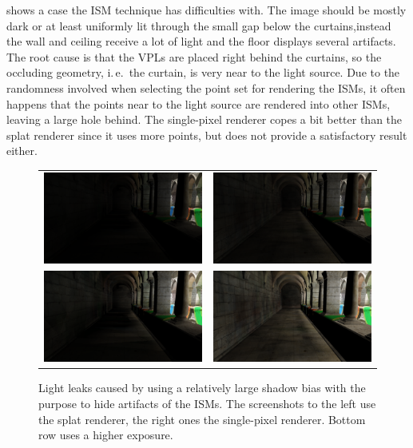  shows a case the ISM technique has difficulties with. The image should be mostly dark or at least uniformly lit through the small gap below the curtains,instead the wall and ceiling receive a lot of light and the floor displays several artifacts. The root cause is that the VPLs are placed right behind the curtains, so the occluding geometry, i.\,e.\, the curtain, is very near to the light source. Due to the randomness involved when selecting the point set for rendering the ISMs, it often happens that the points near to the light source are rendered into other ISMs, leaving a large hole behind. The single-pixel renderer copes a bit better than the splat renderer since it uses more points, but does not provide a satisfactory result either.



\begin{figure}[]
\centering
  \begin{tabular}{@{}cc@{}}
    \includegraphics[width=.48\textwidth]{screenshots/bias_splat} &
    \includegraphics[width=.48\textwidth]{screenshots/bias_single_pixel}\\
      \includegraphics[width=.48\textwidth]{screenshots/bias_splat_exposure} &
      \includegraphics[width=.48\textwidth]{screenshots/bias_single_pixel_exposure}
  \end{tabular}
  \caption{Light leaks caused by using a relatively large shadow bias with the purpose to hide artifacts of the ISMs. The screenshots to the left use the splat renderer, the right ones the single-pixel renderer. Bottom row uses a higher exposure.}
  \label{fig:results:bias}
\end{figure}

